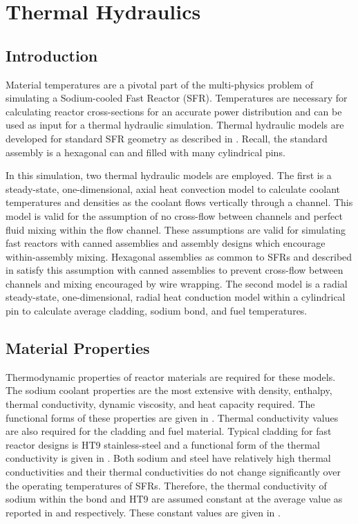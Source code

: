 \chapter{Thermal Hydraulics}
\label{ch:thermalHydraulics}

\section{Introduction}
  Material temperatures are a pivotal part of the multi-physics problem of
  simulating a Sodium-cooled Fast Reactor (SFR). Temperatures are necessary for
  calculating reactor cross-sections for an accurate power distribution and can
  be used as input for a thermal hydraulic simulation. Thermal hydraulic models
  are developed for standard SFR geometry as described in
  . Recall, the standard assembly is a hexagonal 
  can and filled with many cylindrical pins. 

  In this simulation, two thermal hydraulic models are employed. The first is a 
  steady-state, one-dimensional, axial heat convection model to calculate coolant 
  temperatures and densities as the coolant flows vertically through a channel.
  This model is valid for the assumption of no cross-flow between channels and 
  perfect fluid mixing within the flow channel. These assumptions are valid for
  simulating fast reactors with canned assemblies and assembly designs which 
  encourage within-assembly mixing. Hexagonal assemblies as common to SFRs and 
  described in  satisfy this assumption with 
  canned assemblies to prevent cross-flow between channels and mixing encouraged
  by wire wrapping. The second model is a radial steady-state, one-dimensional,
  radial heat conduction model within a cylindrical pin to calculate average 
  cladding, sodium bond, and fuel temperatures.

\section{Material Properties}
  \label{sec:material_properties}
  Thermodynamic properties of reactor materials are required for these models.
  The sodium coolant properties are the most extensive with density, enthalpy, 
  thermal conductivity, dynamic viscosity, and heat capacity required. The 
  functional forms of these properties are given in \cite{sodiumProp}. 
  Thermal conductivity values are also required for the cladding and fuel
  material. Typical cladding for fast reactor designs is HT9 stainless-steel and
  a functional form of the thermal conductivity is given in \cite{ht9Prop}. Both
  sodium and steel have relatively high thermal conductivities and their thermal
  conductivities do not change significantly over the operating temperatures of
  SFRs. Therefore, the thermal conductivity of sodium within the bond and HT9 
  are assumed constant at the average value as reported in \cite{sodiumProp} and
  \cite{ht9Prop} respectively. These constant values are given in 
  .
    
